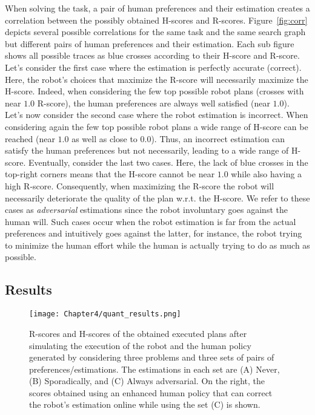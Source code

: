 When solving the task, a pair of human preferences and their estimation creates a correlation between the possibly obtained H-scores and R-scores. Figure~\ref{fig:corr} depicts several possible correlations for the same task and the same search graph but different pairs of human preferences and their estimation. Each sub figure shows all possible traces as blue crosses according to their H-score and R-score. 
Let's consider the first case where the estimation is perfectly accurate (correct). Here, the robot's choices that maximize the R-score will necessarily maximize the H-score. Indeed, when considering the few top possible robot plans (crosses with near $1.0$ R-score), the human preferences are always well satisfied (near $1.0$). 
Let's now consider the second case where the robot estimation is incorrect. When considering again the few top possible robot plans a wide range of H-score can be reached (near $1.0$ as well as close to $0.0$). Thus, an incorrect estimation can satisfy the human preferences but not necessarily, leading to a wide range of H-score.
Eventually, consider the last two cases. Here, the lack of blue crosses in the top-right corners means that the H-score cannot be near $1.0$ while also having a high R-score. Consequently, when maximizing the R-score the robot will necessarily deteriorate the quality of the plan w.r.t. the H-score. We refer to these cases as \textit{adversarial} estimations since the robot involuntary goes against the human will. Such cases occur when the robot estimation is far from the actual preferences and intuitively goes against the latter, for instance, the robot trying to minimize the human effort while the human is actually trying to do as much as possible.  

    \subsection{Results}

\begin{figure}
    \centering
    \texttt{[image: Chapter4/quant\_results.png]}
    \caption{
    R-scores and H-scores of the obtained executed plans after simulating the execution of the robot and the human policy generated by considering three problems and three sets of pairs of preferences/estimations. 
    The estimations in each set are (A) Never, (B) Sporadically, and (C) Always adversarial. On the right, the scores obtained using an enhanced human policy that can correct the robot's estimation online while using the set (C) is shown.
    }    
    \label{fig:heatmaps}
\end{figure}

